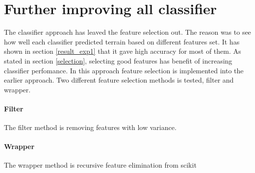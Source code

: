 \documentclass[USenglish]{ifimaster}  %
\begin{document}
\section{Further improving all classifier}
The classifier approach has leaved the feature selection out. The reason was to see how well each classifier predicted terrain based on different features set. It has shown in section \ref{result_exp1} that it gave high accuracy for most of them. As stated in section \ref{selection}, selecting good features has benefit of increasing classifier perfomance. In this approach feature selection is implemented into the earlier approach. Two different feature selection methods is tested, filter and wrapper.

\paragraph{Filter} 
The filter method is removing features with low variance. 

\paragraph{Wrapper}
The wrapper method is recursive feature elimination from scikit
\end{document}
